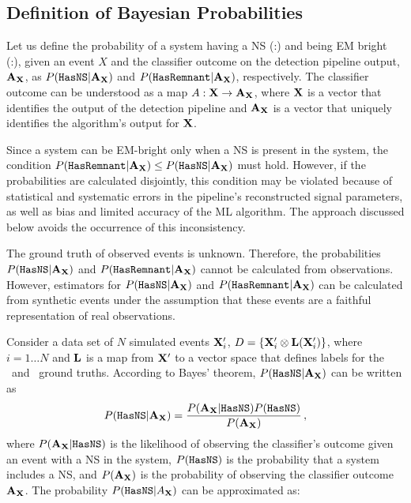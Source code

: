 \subsection{Definition of Bayesian Probabilities} \label{bayesian_probs}

Let us define the probability of a system having a \ac{NS} (\hasns:\true) and being \ac{EM} bright (\hasrem:\true), given an event $X$ and the classifier outcome on the detection pipeline
output, ${\bf A}_{\bf X}$, as $P({{\tt HasNS}}|{\bf A}_{\bf X})$ and $P({{\tt HasRemnant}}|{\bf A}_{\bf X})$, respectively. The classifier outcome can be understood as a map $A:{\bf X}\to {\bf A}_{\bf X}$,
where $\bf X$ is a vector that identifies the output of the detection pipeline and ${\bf A}_{\bf X}$ is a vector that uniquely identifies the algorithm's output for $\bf X$. 

Since a system can be EM-bright only when a \ac{NS} is present in the system, the condition $P({{\tt HasRemnant}}|{\bf A}_{\bf X})\le P({{\tt HasNS}}|{\bf A}_{\bf X})$ must hold. However, if the
probabilities are calculated disjointly, this condition may be violated because of statistical and systematic errors in the pipeline's reconstructed signal parameters, as well as bias and
limited accuracy of the \ac{ML} algorithm. The approach discussed below avoids the occurrence of this inconsistency.

The ground truth of observed events is unknown. Therefore, the probabilities $P({{\tt HasNS}}|{\bf A}_{\bf X})$ and $P({{\tt HasRemnant}}|{\bf A}_{\bf X})$ cannot be calculated from observations. However,
estimators for $P({{\tt HasNS}}|{\bf A}_{\bf X})$ and $P({{\tt HasRemnant}}|{\bf A}_{\bf X})$ can be calculated from synthetic events under the assumption that these events are a faithful representation of
real observations.

Consider a data set of $N$ simulated events ${\bf X}'_i$, $D=\{{\bf X}'_i\otimes{\bf L}({\bf X}'_i)\}$, where $i=1\dots N$ and ${\bf L}$ is a map from ${\bf X}'$ to a vector space
that defines labels for the \hasns\ and \hasrem\ ground truths. According to Bayes' theorem, $P({{\tt HasNS}}|{\bf A}_{\bf X})$  can be written as 
%
\begin{equation}
P({{\tt HasNS}}|{\bf A}_{\bf X})=\frac{P({\bf A}_{\bf X}|{{\tt HasNS}})P({{\tt HasNS}})}{P({\bf A}_{\bf X})}\,,
\label{bayes}
\end{equation}
%
where $P({\bf A}_{\bf X}|{{\tt HasNS}})$ is the likelihood of observing the classifier's outcome given an event with a \ac{NS} in the system, $P({{\tt HasNS}})$ is the probability that a system includes a \ac{NS}, and $P({\bf A}_{\bf X})$ is the probability of observing the classifier outcome ${\bf A}_{\bf X}$. The probability $P({{\tt HasNS}}|A_{\bf X})$ can be approximated as:  
%

